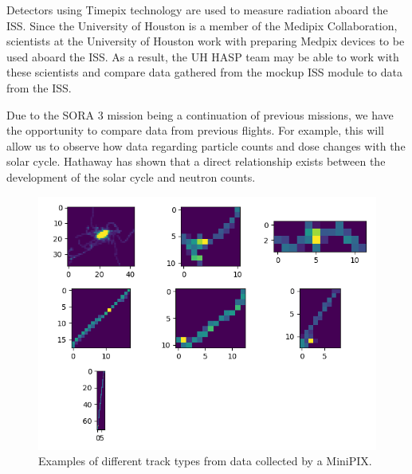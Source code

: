 Detectors using Timepix technology are used to measure radiation aboard the ISS. Since the University of Houston is a member of the Medipix Collaboration, scientists at the University of Houston work with preparing Medpix devices to be used aboard the ISS. As a result, the UH HASP team may be able to work with these scientists and compare data gathered from the mockup ISS module to data from the ISS.

Due to the SORA 3 mission being a continuation of previous missions, we have the opportunity to compare data from previous flights. For example, this will allow us to observe how data regarding particle counts and dose changes with the solar cycle. Hathaway \cite{Hathaway} has shown that a direct relationship exists between the development of the solar cycle and neutron counts.

\begin{figure}[h]
    \includegraphics[scale=1, width=.75\textwidth]{Figures/Tracks.png}
    \caption{Examples of different track types from data collected by a MiniPIX.}
    \label{fig:Tracks}
\end{figure}

